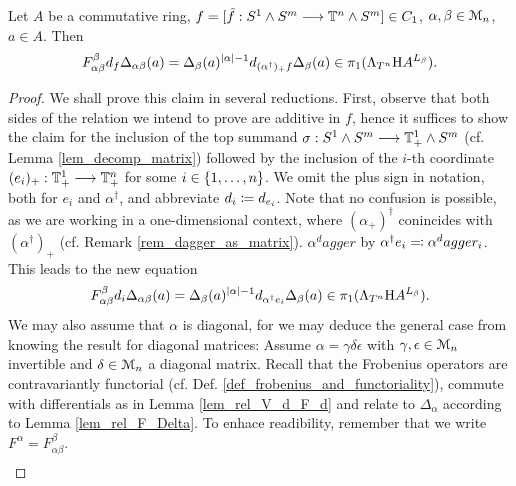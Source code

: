  \begin{prop}\label{prop_fdw_relation_dim1}
    Let $A$ be a commutative ring, $f = [\tilde{f}: S^1 \wedge S^m \longrightarrow \mathbb{T}^n \wedge S^m] \in C_1$, $\alpha,\beta \in \mathcal{M}_n$, $a \in A$. Then
    \begin{equation*}
      F_{\alpha\beta}^\beta d_f \Delta_{\alpha\beta} (a) =%
      \Delta_{\beta} (a)^{\abs{\alpha} - 1} d_{(\alpha^\dagger)_+ f} \Delta_{\beta}(a)%
      \in \pi_1 (\Lambda_{T^n} \H A ^{L_\beta}).%
    \end{equation*}
    \begin{proof}
      We shall prove this claim in several reductions. First, observe that both
      sides of the relation we intend to prove are additive in $f$, hence it
      suffices to show the claim for the inclusion of the top summand $\sigma:
      S^1 \wedge S^m \longrightarrow \mathbb{T}^1_+ \wedge S^m$ (cf. Lemma \ref{lem_decomp_matrix})
      followed by the inclusion of the $i$-th coordinate $(e_i)_+: \mathbb{T}^1_+ \longrightarrow
      \mathbb{T}^n_+$ for some $i \in \{1,\ldots,n\}$. We omit the plus sign in notation,
      both for $e_i$ and $\alpha^\dagger$, and abbreviate $d_i \coloneqq d_{e_i}$.
      Note that no confusion is possible, as we are working in a one-dimensional
      context, where $(\alpha_+)^\dagger$ conincides with $(\alpha^\dagger)_+$
      (cf. Remark \ref{rem_dagger_as_matrix}). %
      $\alpha^dagger$ by $\alpha^\dagger e_i \eqqcolon \alpha^dagger_i$.
      This leads to the new equation
      \begin{displaymath}
      F_{\alpha\beta}^\beta d_i \Delta_{\alpha\beta} (a) =%
        \Delta_{\beta} (a)^{\abs{\alpha} - 1} %
          d_{\alpha^\dagger e_i} \Delta_{\beta}(a) %
          \in \pi_1 (\Lambda_{T^n} \H A ^{L_\beta}).
      \end{displaymath}
      We may also assume that $\alpha$ is diagonal, for we may deduce the
      general case from knowing the result for diagonal matrices: Assume $\alpha
      = \gamma \delta \epsilon$ with $\gamma, \epsilon \in \mathcal{M}_n$ invertible and
      $\delta \in \mathcal{M}_n$ a diagonal matrix. Recall that the Frobenius operators
      are contravariantly functorial (cf. Def.
      \ref{def_frobenius_and_functoriality}), commute with differentials as in
      Lemma \ref{lem_rel_V_d_F_d} and relate to $\Delta_\alpha$ according to
      Lemma \ref{lem_rel_F_Delta}. To enhace readibility, remember that we write
      $F^\alpha = F_{\alpha\beta}^\beta$.
      \begin{gather}\label{eq_Fdw_reduction_diagonal_alpha}

\end{gather}
\end{proof}
\end{prop}
